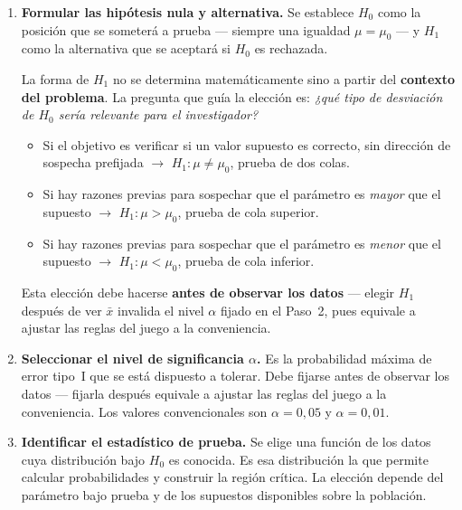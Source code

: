 \documentclass[12pt, a4paper]{book}
\numberwithin{equation}{chapter}
\begin{document}
\begin{enumerate}[label=\textbf{Paso \arabic*.},
	leftmargin=*, itemsep=6pt]
	
	\item \textbf{Formular las hip\'{o}tesis nula
		y alternativa.} Se establece $H_0$ como la
	posici\'{o}n que se someter\'{a} a prueba ---
	siempre una igualdad $\mu = \mu_0$ --- y $H_1$
	como la alternativa que se aceptar\'{a} si
	$H_0$ es rechazada.
	
	La forma de $H_1$ no se determina
	matem\'{a}ticamente sino a partir del
	\textbf{contexto del problema}. La pregunta
	que gu\'{i}a la elecci\'{o}n es: \emph{¿qu\'{e}
		tipo de desviaci\'{o}n de $H_0$ ser\'{i}a
		relevante para el investigador?}
	\begin{itemize}[leftmargin=2em]
		\item Si el objetivo es verificar si un
		valor supuesto es correcto, sin direcci\'{o}n
		de sospecha prefijada $\longrightarrow$
		$H_1: \mu \neq \mu_0$, prueba de dos colas.
		\item Si hay razones previas para sospechar
		que el par\'{a}metro es \emph{mayor} que el
		supuesto $\longrightarrow$ $H_1: \mu > \mu_0$,
		prueba de cola superior.
		\item Si hay razones previas para sospechar
		que el par\'{a}metro es \emph{menor} que el
		supuesto $\longrightarrow$ $H_1: \mu < \mu_0$,
		prueba de cola inferior.
	\end{itemize}
	Esta elecci\'{o}n debe hacerse \textbf{antes
		de observar los datos} --- elegir $H_1$ despu\'{e}s
	de ver $\bar{x}$ invalida el nivel $\alpha$
	fijado en el Paso~2, pues equivale a ajustar
	las reglas del juego a la conveniencia.
	
	\item \textbf{Seleccionar el nivel de
		significancia $\alpha$.} Es la probabilidad
	m\'{a}xima de error tipo~I que se est\'{a}
	dispuesto a tolerar. Debe fijarse antes de
	observar los datos --- fijarla despu\'{e}s
	equivale a ajustar las reglas del juego a la
	conveniencia. Los valores convencionales son
	$\alpha = 0{,}05$ y $\alpha = 0{,}01$.
	
	\item \textbf{Identificar el estad\'{i}stico
		de prueba.} Se elige una funci\'{o}n de los
	datos cuya distribuci\'{o}n bajo $H_0$ es
	conocida. Es esa distribuci\'{o}n la que
	permite calcular probabilidades y construir
	la regi\'{o}n cr\'{i}tica. La elecci\'{o}n
	depende del par\'{a}metro bajo prueba y de
	los supuestos disponibles sobre la poblaci\'{o}n.
	

\end{enumerate}
\end{document}
